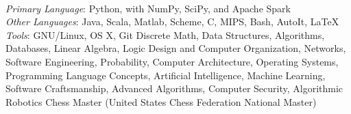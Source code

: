 \documentclass[11pt]{article}
\begin{document}
\begin{adjustwidth}{-2.2cm}{-2.2cm}
    ~\\[0.01\baselineskip]
    \emph{Primary Language}: Python, with NumPy, SciPy, and Apache Spark\\
    \emph{Other Languages}: Java, Scala, Matlab, Scheme, C, MIPS, Bash, AutoIt, \LaTeX\\
    \emph{Tools}: GNU/Linux, OS X, Git
    \eosec
    Discrete Math, Data Structures, Algorithms, Databases, Linear Algebra, Logic Design and Computer Organization, Networks, Software Engineering, Probability, Computer Architecture, Operating Systems, Programming Language Concepts, Artificial Intelligence, Machine Learning, Software Craftsmanship, Advanced Algorithms, Computer Security, Algorithmic Robotics
    \eosec
    Chess Master (United States Chess Federation National Master)
\end{adjustwidth}
\end{document}
